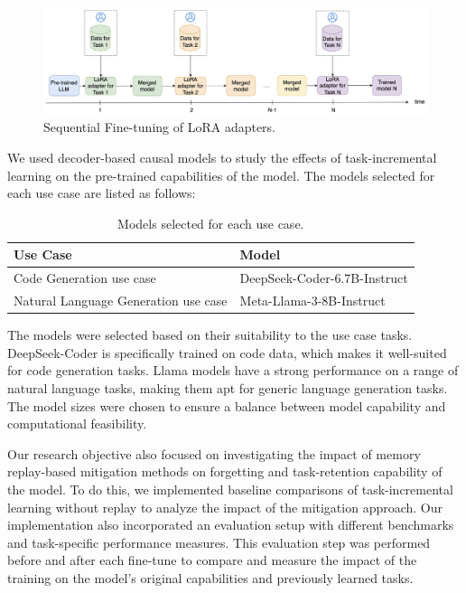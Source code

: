 \begin{figure}[h]
    \centering
    \includegraphics[width=1\textwidth]{Figures/methodology/process_pipeline.jpeg} %
    \caption{Sequential Fine-tuning of LoRA adapters.}
    \label{fig:Sequential Fine-tuning of LoRA adapters}
\end{figure}


We used decoder-based causal models to study the effects of task-incremental learning on the pre-trained capabilities of the model. The models selected for each use case are listed as follows: 

\begin{table}[h]
\centering
\caption{Models selected for each use case.}
\begin{tabular}{| m{7cm} | m{6cm} |}
\hline
\textbf{Use Case} & \textbf{Model} \\
\hline
Code Generation use case & DeepSeek-Coder-6.7B-Instruct \\
\hline
Natural Language Generation use case & Meta-Llama-3-8B-Instruct \\
\hline
\end{tabular}
\end{table}

The models were selected based on their suitability to the use case tasks. DeepSeek-Coder \cite{guo2024deepseek} is specifically trained on code data, which makes it well-suited for code generation tasks. Llama models \cite{touvron2023llama} have a strong performance on a range of natural language tasks, making them apt for generic language generation tasks. The model sizes were chosen to ensure a balance between model capability and computational feasibility.

Our research objective also focused on investigating the impact of memory replay-based mitigation methods on forgetting and task-retention capability of the model. To do this, we implemented baseline comparisons of task-incremental learning without replay to analyze the impact of the mitigation approach. Our implementation also incorporated an evaluation setup with different benchmarks and task-specific performance measures. This evaluation step was performed before and after each fine-tune to compare and measure the impact of the training on the model's original capabilities and previously learned tasks.

